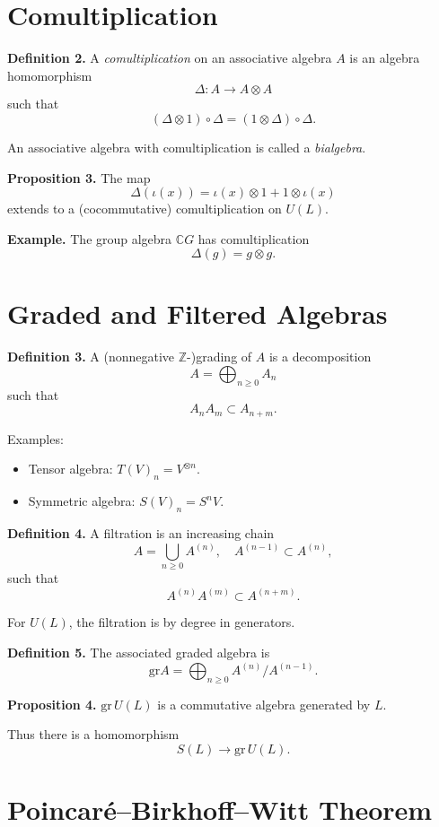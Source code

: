 \section*{Comultiplication}

\textbf{Definition 2.}
A \emph{comultiplication} on an associative algebra $A$ is an algebra
homomorphism
\[
\Delta : A \to A \otimes A
\]
such that
\[
(\Delta \otimes 1)\circ \Delta = (1 \otimes \Delta)\circ \Delta.
\]

An associative algebra with comultiplication is called a \emph{bialgebra}.

\textbf{Proposition 3.}
The map
\[
\Delta(\iota(x)) = \iota(x) \otimes 1 + 1 \otimes \iota(x)
\]
extends to a (cocommutative) comultiplication on $U(L)$.

\textbf{Example.}
The group algebra $\mathbb{C}G$ has comultiplication
\[
\Delta(g) = g \otimes g.
\]

\section*{Graded and Filtered Algebras}

\textbf{Definition 3.}
A (nonnegative $\mathbb{Z}$-)grading of $A$ is a decomposition
\[
A = \bigoplus_{n\ge0} A_n
\]
such that
\[
A_n A_m \subset A_{n+m}.
\]

Examples:

\begin{itemize}
\item Tensor algebra: $T(V)_n = V^{\otimes n}$.
\item Symmetric algebra: $S(V)_n = S^n V$.
\end{itemize}

\textbf{Definition 4.}
A filtration is an increasing chain
\[
A = \bigcup_{n\ge0} A^{(n)},
\quad
A^{(n-1)} \subset A^{(n)},
\]
such that
\[
A^{(n)} A^{(m)} \subset A^{(n+m)}.
\]

For $U(L)$, the filtration is by degree in generators.

\textbf{Definition 5.}
The associated graded algebra is
\[
\mathrm{gr} A = \bigoplus_{n\ge0} A^{(n)}/A^{(n-1)}.
\]

\textbf{Proposition 4.}
$\mathrm{gr}\,U(L)$ is a commutative algebra generated by $L$.

Thus there is a homomorphism
\[
S(L) \to \mathrm{gr}\,U(L).
\]

\section*{Poincaré–Birkhoff–Witt Theorem}

